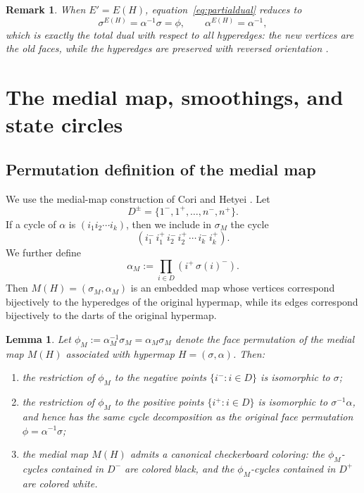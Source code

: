 \documentclass{article}
\newtheorem{lemma}[theorem]{Lemma}
\newtheorem{remark}[theorem]{Remark}
\begin{document}
\begin{remark}\label{rem:total-dual}
When $E'=E(H)$, equation~\eqref{eq:partialdual} reduces to
\[
\sigma^{E(H)}=\alpha^{-1}\sigma=\phi,
\qquad
\alpha^{E(H)}=\alpha^{-1},
\]
which is exactly the total dual with respect to all hyperedges: the new vertices are the old faces, while the hyperedges are preserved with reversed orientation \cite{ChmutovVignes2022}.
\end{remark}

\section{The medial map, smoothings, and state circles}

\subsection{Permutation definition of the medial map}

We use the medial-map construction of Cori and Hetyei \cite[Definition~3.1]{CoriHetyei2025}. Let
\[
D^{\pm}=\{1^-,1^+,\dots,n^-,n^+\}.
\]
If a cycle of $\alpha$ is $(i_1i_2\cdots i_k)$, then we include in $\sigma_M$ the cycle
\[
(i_1^-\,i_1^+\,i_2^-\,i_2^+\,\cdots\,i_k^-\,i_k^+).
\]
We further define
\[
\alpha_M:=\prod_{i\in D}(i^+\,\sigma(i)^-).
\]
Then $M(H)=(\sigma_M,\alpha_M)$ is an embedded map whose vertices correspond bijectively to the hyperedges of the original hypermap, while its edges correspond bijectively to the darts of the original hypermap.

\begin{lemma}\label{lem:checkerboard}
Let $\phi_M:=\alpha_M^{-1}\sigma_M=\alpha_M\sigma_M$ denote the face permutation of the medial map $M(H)$ associated with hypermap $H=(\sigma,\alpha)$. Then:
\begin{enumerate}
  \item the restriction of $\phi_M$ to the negative points $\{i^-:i\in D\}$ is isomorphic to $\sigma$;
  \item the restriction of $\phi_M$ to the positive points $\{i^+:i\in D\}$ is isomorphic to $\sigma^{-1}\alpha$, and hence has the same cycle decomposition as the original face permutation $\phi=\alpha^{-1}\sigma$;
  \item the medial map \(M(H)\) admits a canonical checkerboard coloring: the
\(\phi_M\)-cycles contained in \(D^-\) are colored black, and the
\(\phi_M\)-cycles contained in \(D^+\) are colored white. 
\end{enumerate}
\end{lemma}
\end{document}
